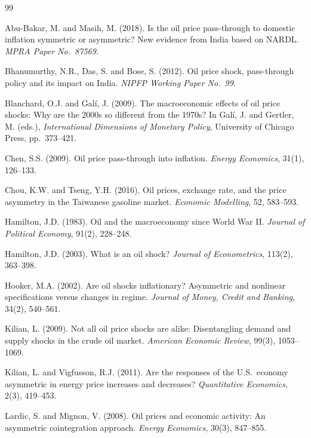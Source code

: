 \documentclass[12pt,a4paper,oneside]{report}
\begin{document}
\begin{thebibliography}{99}

Abu-Bakar, M. and Masih, M. (2018). Is the oil price pass-through to domestic inflation symmetric or asymmetric? New evidence from India based on NARDL. \textit{MPRA Paper No.\ 87569}.

Bhanumurthy, N.R., Das, S. and Bose, S. (2012). Oil price shock, pass-through policy and its impact on India. \textit{NIPFP Working Paper No.\ 99}.

Blanchard, O.J. and Gal\'{i}, J. (2009). The macroeconomic effects of oil price shocks: Why are the 2000s so different from the 1970s? In Gal\'{i}, J. and Gertler, M. (eds.), \textit{International Dimensions of Monetary Policy}, University of Chicago Press, pp.\ 373--421.

Chen, S.S. (2009). Oil price pass-through into inflation. \textit{Energy Economics}, 31(1), 126--133.

Chou, K.W. and Tseng, Y.H. (2016). Oil prices, exchange rate, and the price asymmetry in the Taiwanese gasoline market. \textit{Economic Modelling}, 52, 583--593.

Hamilton, J.D. (1983). Oil and the macroeconomy since World War II. \textit{Journal of Political Economy}, 91(2), 228--248.

Hamilton, J.D. (2003). What is an oil shock? \textit{Journal of Econometrics}, 113(2), 363--398.

Hooker, M.A. (2002). Are oil shocks inflationary? Asymmetric and nonlinear specifications versus changes in regime. \textit{Journal of Money, Credit and Banking}, 34(2), 540--561.

Kilian, L. (2009). Not all oil price shocks are alike: Disentangling demand and supply shocks in the crude oil market. \textit{American Economic Review}, 99(3), 1053--1069.

Kilian, L. and Vigfusson, R.J. (2011). Are the responses of the U.S.\ economy asymmetric in energy price increases and decreases? \textit{Quantitative Economics}, 2(3), 419--453.

Lardic, S. and Mignon, V. (2008). Oil prices and economic activity: An asymmetric cointegration approach. \textit{Energy Economics}, 30(3), 847--855.


\end{thebibliography}
\end{document}
